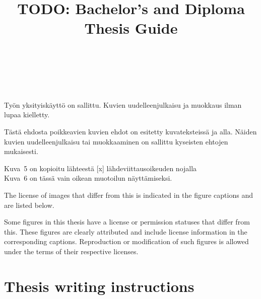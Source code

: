 \documentclass[english, cse, master]{dithesis}
\title{TODO: Bachelor's and Diploma Thesis Guide}
\newcommand{\crpar}{\vspace{1\baselineskip}\par\noindent}
\begin{document}
\hypersetup{pageanchor=false}
\maketitlepage
    \setcounter{page}{1}
    \hypersetup{pageanchor=true}
    \makecopyrightpage
    \copyrighttext%
        {\copyrightstring\ \allrightsreservedfin}%
        {%
          \copyrightstring\ \allrightsreservedfin
          \crpar
          Työn yksityiskäyttö on sallittu. Kuvien uudelleenjulkaisu ja
          muokkaus ilman lupaa kielletty.
          \crpar
          Tästä ehdosta poikkeavien kuvien ehdot on esitetty kuvateksteissä ja alla. Näiden kuvien uudelleenjulkaisu tai muokkaaminen on sallittu kyseisten ehtojen mukaisesti.
          \crpar
          Kuva~5 on kopioitu lähteestä [x] lähdeviittausoikeuden nojalla \\
          Kuva~6 on tässä vain oikean muotoilun näyttämiseksi.
        }
    \makecopyrightpage

  {%
    \copyrightstring
    \doclicenseThis %
    \crpar
    The license of images that differ from this is indicated in the figure captions and are listed below.\par
  }
  \makecopyrightpage
  \makeatletter\makeatother
  {%
    \copyrightstring
    \doclicenseThis %
    \crpar
    Some figures in this thesis have a license or permission statuses that differ from this. These figures are clearly attributed and include license information in the corresponding captions. Reproduction or modification of such figures is allowed under the terms of their respective licenses.
  }
  \makecopyrightpage
    \chapter{Thesis writing instructions}
        \label{implementation}
        
    \printbibliography[heading=bibnumbered, title=\mybibname]    
\end{document}
